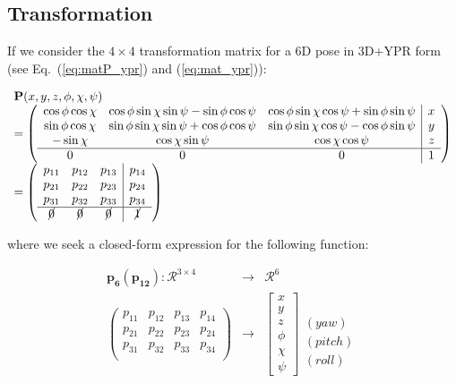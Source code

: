 \documentclass[a4paper,11pt]{report}
\begin{document}
\subsection{Transformation}

If we consider the $4 \times 4$ transformation matrix for
a 6D pose in 3D+YPR form (see Eq.~(\ref{eq:matP_ypr}) and (\ref{eq:mat_ypr})):

\begin{equation*}
\begin{array}{l}
\mathbf{P}(x,y,z,\phi,\chi,\psi)  \\
=\left(
  \begin{array}{ccc|c}
   \cos \phi \cos \chi  & \cos \phi \sin \chi \sin \psi - \sin \phi \cos \psi   & \cos \phi \sin \chi \cos \psi + \sin \phi \sin \psi & x \\
   \sin \phi \cos \chi  & \sin \phi \sin \chi \sin \psi + \cos \phi \cos \psi  &  \sin \phi \sin \chi \cos \psi - \cos \phi \sin \psi & y \\
   -\sin \chi & \cos \chi \sin \psi  &  \cos \chi \cos \psi & z \\ \hline
   0 & 0 & 0& 1
  \end{array}
\right) \\
=\left(
  \begin{array}{ccc|c}
   p_{11} & p_{12}& p_{13}& p_{14} \\
   p_{21} & p_{22}& p_{23}& p_{24} \\
   p_{31} & p_{32}& p_{33}& p_{34} \\
 \hline
   \cancel{0} & \cancel{0} & \cancel{0} & \cancel{1}
  \end{array}
\right)
\end{array}
\end{equation*}

\noindent where we seek a closed-form expression for the following function:

\begin{eqnarray*}
\mathbf{p_{6}}(\mathbf{p_{12}}): \mathcal{R}^{3 \times 4} &\rightarrow& \mathcal{R}^6
\\
\left(
\begin{array}{ccc|c}
	p_{11} & p_{12}& p_{13}& p_{14} \\
	p_{21} & p_{22}& p_{23}& p_{24} \\
	p_{31} & p_{32}& p_{33}& p_{34} \\
\end{array}
\right)
 &\rightarrow&
\begin{bmatrix}
	x \\ y \\ z \\ \phi \\ \chi \\ \psi
\end{bmatrix}
\begin{array}{c}
	\\ \\ \\ (yaw) \\ (pitch) \\ (roll)
\end{array}
\end{eqnarray*}
\end{document}
